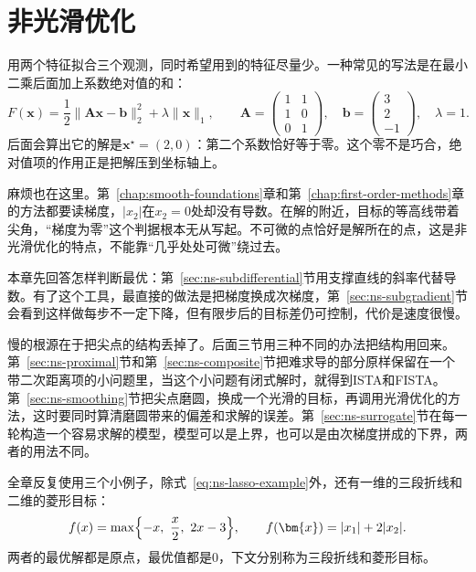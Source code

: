 \chapter{非光滑优化}
\label{chap:nonsmooth-composite-optimization}

用两个特征拟合三个观测，同时希望用到的特征尽量少。一种常见的写法是在最小二乘后面加上系数绝对值的和：
\begin{equation}
 F(\bm{x})=\frac12\lVert\bm{A}\bm{x}-\bm{b}\rVert_2^2+\lambda\lVert\bm{x}\rVert_1,\qquad
 \bm{A}=\begin{pmatrix}1&1\\1&0\\0&1\end{pmatrix},\quad
 \bm{b}=\begin{pmatrix}3\\2\\-1\end{pmatrix},\quad
 \lambda=1.
 \label{eq:ns-lasso-example}
\end{equation}
后面会算出它的解是$\bm{x}^\star=(2,0)$：第二个系数恰好等于零。这个零不是巧合，绝对值项的作用正是把解压到坐标轴上。

麻烦也在这里。第~\ref{chap:smooth-foundations}章和第~\ref{chap:first-order-methods}章的方法都要读梯度，$\lvert x_2\rvert$在$x_2=0$处却没有导数。在解的附近，目标的等高线带着尖角，“梯度为零”这个判据根本无从写起。不可微的点恰好是解所在的点，这是非光滑优化的特点，不能靠“几乎处处可微”绕过去。

本章先回答怎样判断最优：第~\ref{sec:ns-subdifferential}节用支撑直线的斜率代替导数。有了这个工具，最直接的做法是把梯度换成次梯度，第~\ref{sec:ns-subgradient}节会看到这样做每步不一定下降，但有限步后的目标差仍可控制，代价是速度很慢。

慢的根源在于把尖点的结构丢掉了。后面三节用三种不同的办法把结构用回来。第~\ref{sec:ns-proximal}节和第~\ref{sec:ns-composite}节把难求导的部分原样保留在一个带二次距离项的小问题里，当这个小问题有闭式解时，就得到ISTA和FISTA。第~\ref{sec:ns-smoothing}节把尖点磨圆，换成一个光滑的目标，再调用光滑优化的方法，这时要同时算清磨圆带来的偏差和求解的误差。第~\ref{sec:ns-surrogate}节在每一轮构造一个容易求解的模型，模型可以是上界，也可以是由次梯度拼成的下界，两者的用法不同。

全章反复使用三个小例子，除式~\eqref{eq:ns-lasso-example}外，还有一维的三段折线和二维的菱形目标：
\begin{equation}
 f(x)=\max\Bigl\{-x,\ \frac{x}{2},\ 2x-3\Bigr\},\qquad
 f(\bm{x})=\lvert x_1\rvert+2\lvert x_2\rvert.
 \label{eq:ns-running-examples}
\end{equation}
两者的最优解都是原点，最优值都是$0$，下文分别称为三段折线和菱形目标。

